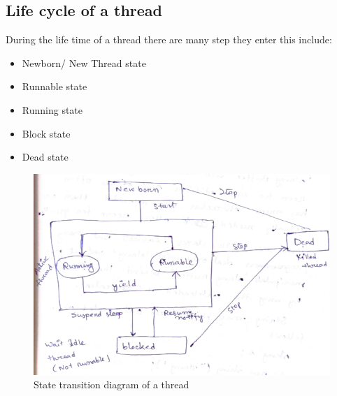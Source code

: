 \documentclass[twocolumn, a4paper]{article}
\begin{document}
\subsection{Life cycle of a thread}
During the life time of a thread there are many step they enter this include:
\begin{itemize}
  \item Newborn/ New Thread state
  \item Runnable state
  \item Running state
  \item Block state
  \item Dead state
\end{itemize}
\begin{figure}[h]
  \centering
  \includegraphics[width=\columnwidth]{strandiagtrd}
  \caption{State transition diagram of a thread}
\end{figure}
\end{document}
